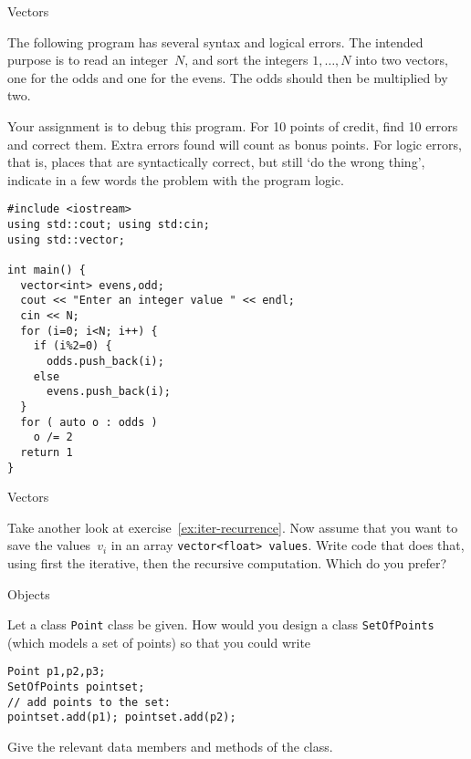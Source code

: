  {Vectors}

\begin{exercise}
  \label{ex:lotsatypos}
The following program has several syntax and logical errors. The
intended purpose is to read an integer~$N$, and sort the integers
$1,\ldots,N$ into two vectors, one for the odds and one for the evens.
The odds should then be multiplied by two.

Your assignment is to debug this program. For 10 points of credit,
find 10 errors and correct them. Extra errors found will count as
bonus points. For logic errors, that is, places that are syntactically
correct, but still `do the wrong thing', indicate in a few words the problem with
the program logic.

\begin{lstlisting}
#include <iostream>
using std::cout; using std:cin;
using std::vector;

int main() {
  vector<int> evens,odd;
  cout << "Enter an integer value " << endl;
  cin << N;
  for (i=0; i<N; i++) {
    if (i%2=0) {
      odds.push_back(i);
    else
      evens.push_back(i);
  }
  for ( auto o : odds )
    o /= 2
  return 1
}
\end{lstlisting}
\end{exercise}

 {Vectors}

\begin{exercise}
  \label{ex:vector-recurrence}
  Take another look at exercise~\ref{ex:iter-recurrence}. Now assume
  that you want to save the values~$v_i$ in an array
  \lstinline{vector<float> values}. Write code that does that, using
  first the iterative, then the recursive computation. Which do you prefer?
\end{exercise}

 {Objects}

\begin{exercise}
  \label{ex:pointset-add}
  Let a class \lstinline{Point} class be given. 
  How would you design a class \lstinline{SetOfPoints} (which models a set of
  points) so that you could write

\begin{lstlisting}
Point p1,p2,p3;
SetOfPoints pointset;
// add points to the set:
pointset.add(p1); pointset.add(p2);
\end{lstlisting}

 Give the relevant data members and methods of the class.
\end{exercise}


